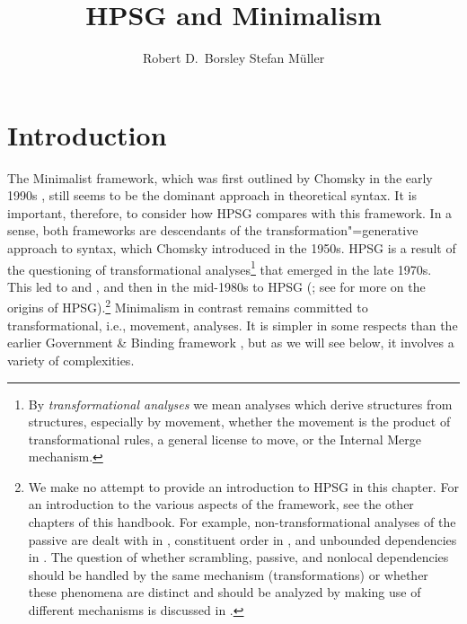 \documentclass[output=paper
 	        ,biblatex
                ,babelshorthands
                ,newtxmath
                ,draftmode
                ,colorlinks, citecolor=brown
]{langscibook}
\author{%
	Robert D.\ Borsley\affiliation{University of Essex and Bangor University}%
	\lastand Stefan Müller\affiliation{Humboldt-Universität zu Berlin}%
}
\title{HPSG and Minimalism}
\begin{document}
\maketitle
\label{chap-minimalism}

\section{Introduction}
\label{sec:min-intro}


The Minimalist framework, which was first outlined by Chomsky in the early 1990s
\citep{Chomsky93b-u,Chomsky95a-u}, still seems to be the dominant approach in theoretical syntax. It is
important, therefore, to consider how HPSG compares with this framework. In a sense, both frameworks
are descendants of the transformation"=generative approach to syntax, which Chomsky introduced in the
1950s. HPSG is a result of the questioning of transformational analyses\footnote{%
By \emph{transformational analyses} we mean analyses which derive structures from structures, especially
by movement, whether the movement is the product of transformational rules, a general license to
move, or the Internal Merge mechanism.} that emerged in the late
1970s. This led to  \citep{BK82a} and  \citep*{GKPS85a}, and then in
the mid-1980s to HPSG (\citealt{ps}; see  for more on the origins of HPSG).\footnote{
We make no attempt to provide an introduction to HPSG in this chapter. For an introduction to the
various aspects of the framework, see the other chapters of this handbook. For example,
non-transformational analyses of the passive are dealt with in ,
constituent order in , and unbounded dependencies in . The
question of whether scrambling, passive, and nonlocal dependencies should be handled by the same
mechanism (\eg transformations) or whether these phenomena are distinct and should be analyzed by
making use of different mechanisms is discussed in .%
} Minimalism in contrast
remains committed to transformational, i.e., movement, analyses. It is simpler in some respects than
the earlier Government \& Binding framework \citep{Chomsky81a}, but as we will see below, it involves a variety of
complexities. 
\end{document}
